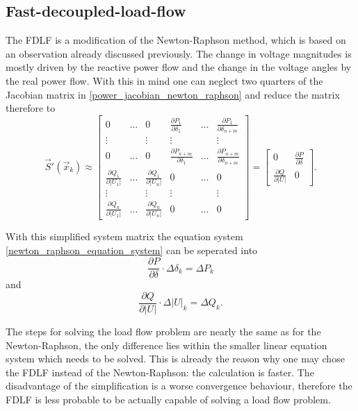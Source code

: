 \subsection{Fast-decoupled-load-flow}
\label{sec:fdlf}
The FDLF is a modification of the Newton-Raphson method, which is based on an observation already discussed previously. The change in voltage magnitudes is mostly driven by the reactive power flow and the change in the voltage angles by the real power flow. With this in mind one can neglect two quarters of the Jacobian matrix in \eqref{power_jacobian_newton_raphson} and reduce the matrix therefore to
\begin{equation}
	\vec S' (\vec x_k) \approx 
	\begin{bmatrix}
		0	& \hdots	& 0	& \frac{\partial P_1}{\partial \delta_1}	& \hdots	& \frac{\partial P_1}{\partial \delta_{n + m}} \\
		\vdots								&			& \vdots								& \vdots									&			& \vdots \\
		0	& \hdots	& 0	& \frac{\partial P_{n + m}}{\partial \delta_1}	& \hdots	& \frac{\partial P_{n + m}}{\partial \delta_{n + m}} \\
		\frac{\partial Q_1}{\partial |U_1|}	& \hdots	& \frac{\partial Q_1}{\partial |U_n|}	& 0	& \hdots	& 0 \\
		\vdots								&			& \vdots								& \vdots									&			& \vdots \\
		\frac{\partial Q_n}{\partial |U_1|}	& \hdots	& \frac{\partial Q_n}{\partial |U_n|}	& 0	& \hdots	& 0
	\end{bmatrix} =
	\begin{bmatrix}
		0								&	\frac{\partial P}{\partial \delta} \\
		\frac{\partial Q}{\partial |U|}	&	0
	\end{bmatrix}.
\end{equation}

With this simplified system matrix the equation system \eqref{newton_raphson_equation_system} can be seperated into
\begin{equation}
	\frac{\partial P}{\partial \delta} \cdot \Delta \delta_k = \Delta P_k
\end{equation}
and
\begin{equation}
	\frac{\partial Q}{\partial |U|} \cdot \Delta |U|_k = \Delta Q_k.
\end{equation}

The steps for solving the load flow problem are nearly the same as for the Newton-Raphson, the only difference lies within the smaller linear equation system which needs to be solved. This is already the reason why one may chose the FDLF instead of the Newton-Raphson: the calculation is faster. The disadvantage of the simplification is a worse convergence behaviour, therefore the FDLF is less probable to be actually capable of solving a load flow problem.

